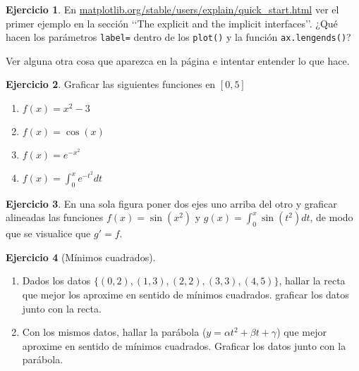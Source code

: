 \documentclass[a4paper,12pt]{book}
\theoremstyle{definition}
\newtheorem{ejercicio}{Ejercicio}
\begin{document}
	\begin{ejercicio}
		En \href{https://matplotlib.org/stable/users/explain/quick_start.html}{matplotlib.org/stable/users/explain/quick\_start.html} ver el primer ejemplo en la sección \lq\lq The explicit and the implicit interfaces\rq\rq. ¿Qué hacen los parámetros {\tt label=} dentro de los {\tt plot()} y la función {\tt ax.lengends()}?
		
		Ver alguna otra cosa que aparezca en la página e intentar entender lo que hace.
	\end{ejercicio}
	
	\begin{ejercicio}
		Graficar las siguientes funciones en $[0,5]$
		\begin{enumerate}
			\item $f(x) = x^2 - 3$
			\item $f(x) = \cos(x)$
			\item $f(x) = e^{-x^2}$
			\item $f(x) = \int_0^xe^{-t^2}dt$
		\end{enumerate}
	\end{ejercicio}
	
	\begin{ejercicio}
		En una sola figura poner dos ejes uno arriba del otro y graficar alineadas las funciones $f(x)=\sin(x^2)$ y $g(x)=\int_0^x\sin(t^2)dt$, de modo que se visualice que $g'=f$. 
	\end{ejercicio}
	
	\begin{ejercicio}[Mínimos cuadrados]
		\begin{enumerate}
			\item Dados los datos $\{(0,2), (1,3), (2,2), (3,3), (4,5)\}$, hallar la recta que mejor los aproxime en sentido de mínimos cuadrados. graficar los datos junto con la recta.
			
			\item Con los mismos datos, hallar la parábola ($y = \alpha t^2 + \beta t + \gamma$) que mejor aproxime en sentido de mínimos cuadrados. Graficar los datos junto con la parábola.
		\end{enumerate}
	\end{ejercicio}
	
\end{document}
